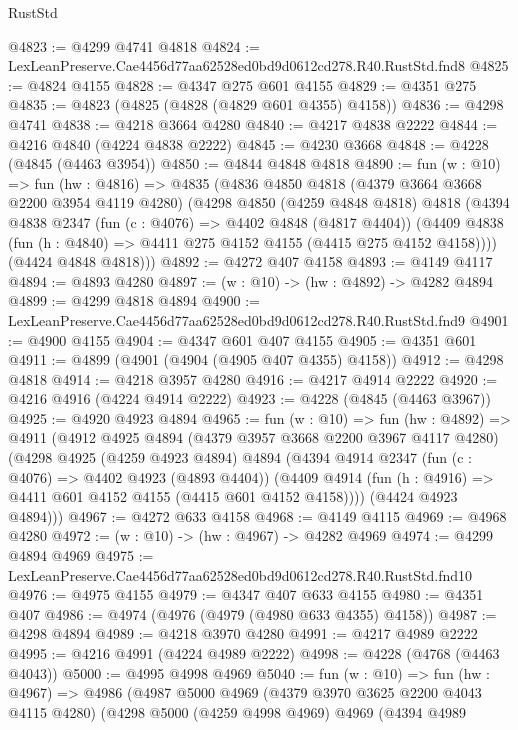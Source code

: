 \begin{lexlean}{RustStd}
\begin{coremodule}
@4823 := @4299 @4741 @4818
@4824 := LexLeanPreserve.Cae4456d77aa62528ed0bd9d0612cd278.R40.RustStd.fnd8
@4825 := @4824 @4155
@4828 := @4347 @275 @601 @4155
@4829 := @4351 @275
@4835 := @4823 (@4825 (@4828 (@4829 @601 @4355) @4158))
@4836 := @4298 @4741
@4838 := @4218 @3664 @4280
@4840 := @4217 @4838 @2222
@4844 := @4216 @4840 (@4224 @4838 @2222)
@4845 := @4230 @3668
@4848 := @4228 (@4845 (@4463 @3954))
@4850 := @4844 @4848 @4818
@4890 := fun (w : @10) =>
  fun (hw : @4816) =>
  @4835
    (@4836
      @4850
      @4818
      (@4379 @3664 @3668 @2200 @3954 @4119 @4280)
      (@4298
        @4850
        (@4259 @4848 @4818)
        @4818
        (@4394
          @4838
          @2347
          (fun (c : @4076) => @4402 @4848 (@4817 @4404))
          (@4409 @4838 (fun (h : @4840) => @4411 @275 @4152 @4155 (@4415 @275 @4152 @4158))))
        (@4424 @4848 @4818)))
@4892 := @4272 @407 @4158
@4893 := @4149 @4117
@4894 := @4893 @4280
@4897 := (w : @10) -> (hw : @4892) -> @4282 @4894
@4899 := @4299 @4818 @4894
@4900 := LexLeanPreserve.Cae4456d77aa62528ed0bd9d0612cd278.R40.RustStd.fnd9
@4901 := @4900 @4155
@4904 := @4347 @601 @407 @4155
@4905 := @4351 @601
@4911 := @4899 (@4901 (@4904 (@4905 @407 @4355) @4158))
@4912 := @4298 @4818
@4914 := @4218 @3957 @4280
@4916 := @4217 @4914 @2222
@4920 := @4216 @4916 (@4224 @4914 @2222)
@4923 := @4228 (@4845 (@4463 @3967))
@4925 := @4920 @4923 @4894
@4965 := fun (w : @10) =>
  fun (hw : @4892) =>
  @4911
    (@4912
      @4925
      @4894
      (@4379 @3957 @3668 @2200 @3967 @4117 @4280)
      (@4298
        @4925
        (@4259 @4923 @4894)
        @4894
        (@4394
          @4914
          @2347
          (fun (c : @4076) => @4402 @4923 (@4893 @4404))
          (@4409 @4914 (fun (h : @4916) => @4411 @601 @4152 @4155 (@4415 @601 @4152 @4158))))
        (@4424 @4923 @4894)))
@4967 := @4272 @633 @4158
@4968 := @4149 @4115
@4969 := @4968 @4280
@4972 := (w : @10) -> (hw : @4967) -> @4282 @4969
@4974 := @4299 @4894 @4969
@4975 := LexLeanPreserve.Cae4456d77aa62528ed0bd9d0612cd278.R40.RustStd.fnd10
@4976 := @4975 @4155
@4979 := @4347 @407 @633 @4155
@4980 := @4351 @407
@4986 := @4974 (@4976 (@4979 (@4980 @633 @4355) @4158))
@4987 := @4298 @4894
@4989 := @4218 @3970 @4280
@4991 := @4217 @4989 @2222
@4995 := @4216 @4991 (@4224 @4989 @2222)
@4998 := @4228 (@4768 (@4463 @4043))
@5000 := @4995 @4998 @4969
@5040 := fun (w : @10) =>
  fun (hw : @4967) =>
  @4986
    (@4987
      @5000
      @4969
      (@4379 @3970 @3625 @2200 @4043 @4115 @4280)
      (@4298
        @5000
        (@4259 @4998 @4969)
        @4969
        (@4394
          @4989

\end{coremodule}
\end{lexlean}
